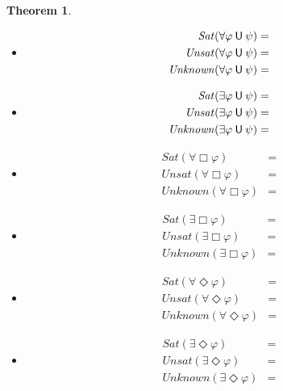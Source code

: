 \documentclass[12pt]{article}
\newcommand{\always}{\Box}
\newcommand{\eventually}{\Diamond}
\newcommand{\nxt}{\bigcirc}
\newcommand{\until}{\mathbin{\sf U}}
\newcommand{\FALSE}{\mbox{\lstinline{false}}}
\newtheorem{theorem}{Theorem}
\theoremstyle{definition}
\begin{document}
\begin{theorem}
\begin{itemize}
\begin{align*}
\begin{array}{ll}
\{\, s \in S \mid \mathit{post}(s) \cap \mathit{Sat}(\varphi) \not= \emptyset \,\} & \mbox{otherwise}
\end{array}
\right .\\
\mathit{Unsat}(\exists \nxt \varphi) & = 
\left \{
\begin{array}{ll}
S & \mbox{if $\varphi \equiv \FALSE$}\\
\{\, s \in F \mid \mathit{post}(s) \subseteq \mathit{Unsat}(\varphi) \,\} & \mbox{otherwise}
\end{array}
\right .\\
\mathit{Unknown}(\exists \nxt \varphi) & = S \setminus (\mathit{Sat}(\exists \nxt \varphi) \cup \mathit{Unsat}(\exists \nxt \varphi))
\end{align*}
\item
\begin{align*}
\mathit{Sat}(\forall \varphi \until \psi) & = \\
\mathit{Unsat}(\forall \varphi \until \psi) & = \\
\mathit{Unknown}(\forall \varphi \until \psi) & = 
\end{align*}
\item
\begin{align*}
\mathit{Sat}(\exists \varphi \until \psi) & = \\
\mathit{Unsat}(\exists \varphi \until \psi) & = \\
\mathit{Unknown}(\exists \varphi \until \psi) & = 
\end{align*}
\item
\begin{align*}
\mathit{Sat}(\forall \always \varphi) & = \\
\mathit{Unsat}(\forall \always \varphi) & = \\
\mathit{Unknown}(\forall \always \varphi) & = 
\end{align*}
\item
\begin{align*}
\mathit{Sat}(\exists \always \varphi) & = \\
\mathit{Unsat}(\exists \always \varphi) & = \\
\mathit{Unknown}(\exists \always \varphi) & = 
\end{align*}
\item
\begin{align*}
\mathit{Sat}(\forall \eventually \varphi) & = \\
\mathit{Unsat}(\forall \eventually \varphi) & = \\
\mathit{Unknown}(\forall \eventually \varphi) & = 
\end{align*}
\item
\begin{align*}
\mathit{Sat}(\exists \eventually \varphi) & = \\
\mathit{Unsat}(\exists \eventually \varphi) & = \\
\mathit{Unknown}(\exists \eventually \varphi) & = 
\end{align*}
\end{itemize}
\end{theorem}
\end{document}
